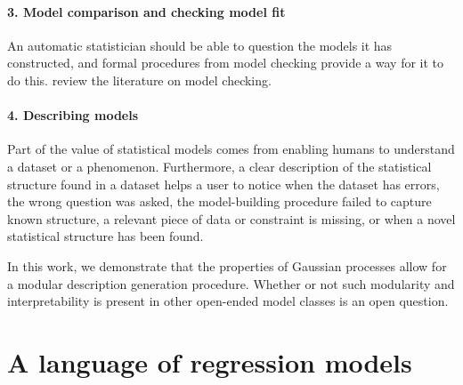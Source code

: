 \documentclass[letterpaper]{article}
\begin{document}
\paragraph{3. Model comparison and checking model fit}
An automatic statistician should be able to question the models it has constructed, and formal procedures from model checking provide a way for it to do this.
\citet{gelman2012philosophy} review the literature on model checking.

\paragraph{4. Describing models}

Part of the value of statistical models comes from enabling humans to understand a dataset or a phenomenon.
Furthermore, a clear description of the statistical structure found in a dataset helps a user to notice when the dataset has errors, the wrong question was asked, the model-building procedure failed to capture known structure, a relevant piece of data or constraint is missing, or when a novel statistical structure has been found.

In this work, we 
demonstrate that the properties of Gaussian processes allow for a modular description generation procedure.
Whether or not such modularity and interpretability is present in other open-ended model classes is an open question.

\section{A language of regression models}
\label{sec:improvements}
\end{document}
